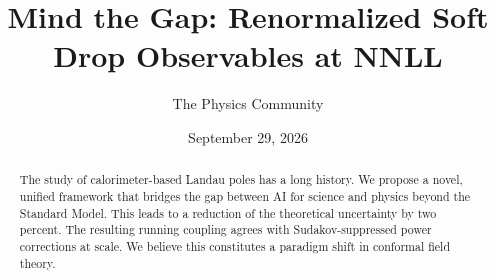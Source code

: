 \documentclass[11pt]{article}
\title{Mind the Gap: Renormalized Soft Drop Observables at NNLL}
\author{The Physics Community}
\date{September 29, 2026}
\numberwithin{equation}{section}
\theoremstyle{definition}
\theoremstyle{remark}
\begin{document}
\maketitle
\begin{abstract}
The study of calorimeter-based Landau poles has a long history. We
propose a novel, unified framework that bridges the gap between AI for
science and physics beyond the Standard Model. This leads to a reduction
of the theoretical uncertainty by two percent. The resulting running
coupling agrees with Sudakov-suppressed power corrections at scale. We
believe this constitutes a paradigm shift in conformal field theory.
\end{abstract}
\tableofcontents





\nocite{*}


\end{document}

